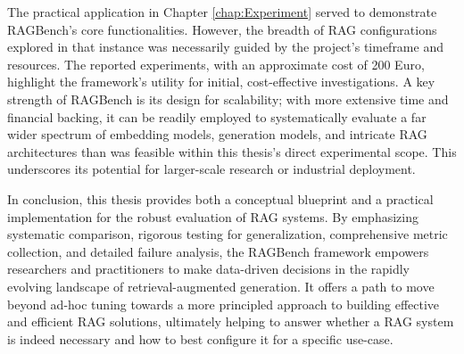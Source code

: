 The practical application in Chapter \ref{chap:Experiment} served to demonstrate RAGBench's core functionalities. However, the breadth of RAG configurations explored in that instance was necessarily guided by the project's timeframe and resources. The reported experiments, with an approximate cost of 200 Euro, highlight the framework's utility for initial, cost-effective investigations. A key strength of RAGBench is its design for scalability; with more extensive time and financial backing, it can be readily employed to systematically evaluate a far wider spectrum of embedding models, generation models, and intricate RAG architectures than was feasible within this thesis's direct experimental scope. This underscores its potential for larger-scale research or industrial deployment.

In conclusion, this thesis provides both a conceptual blueprint and a practical implementation for the robust evaluation of RAG systems. By emphasizing systematic comparison, rigorous testing for generalization, comprehensive metric collection, and detailed failure analysis, the RAGBench framework empowers researchers and practitioners to make data-driven decisions in the rapidly evolving landscape of retrieval-augmented generation. It offers a path to move beyond ad-hoc tuning towards a more principled approach to building effective and efficient RAG solutions, ultimately helping to answer whether a RAG system is indeed necessary and how to best configure it for a specific use-case.